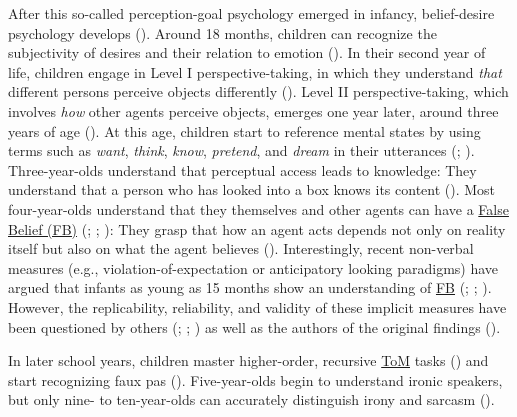 \documentclass[
]{scrbook}
\begin{document}
After this so-called perception-goal psychology emerged in infancy, belief-desire psychology develops (). Around 18 months, children can recognize the subjectivity of desires and their relation to emotion (). In their second year of life, children engage in Level I perspective-taking, in which they understand \emph{that} different persons perceive objects differently (). Level II perspective-taking, which involves \emph{how} other agents perceive objects, emerges one year later, around three years of age (). At this age, children start to reference mental states by using terms such as \emph{want}, \emph{think}, \emph{know}, \emph{pretend}, and \emph{dream} in their utterances (; ). Three-year-olds understand that perceptual access leads to knowledge: They understand that a person who has looked into a box knows its content (). Most four-year-olds understand that they themselves and other agents can have a \hyperref[acronyms_FB]{False Belief (FB)} (; ; ): They grasp that how an agent acts depends not only on reality itself but also on what the agent believes (). Interestingly, recent non-verbal measures (e.g., violation-of-expectation or anticipatory looking paradigms) have argued that infants as young as 15 months show an understanding of \hyperref[acronyms_FB]{FB} (; ; ). However, the replicability, reliability, and validity of these implicit measures have been questioned by others (; ; ) as well as the authors of the original findings ().

In later school years, children master higher-order, recursive \hyperref[acronyms_ToM]{ToM} tasks () and start recognizing faux pas (). Five-year-olds begin to understand ironic speakers, but only nine- to ten-year-olds can accurately distinguish irony and sarcasm ().
\end{document}
